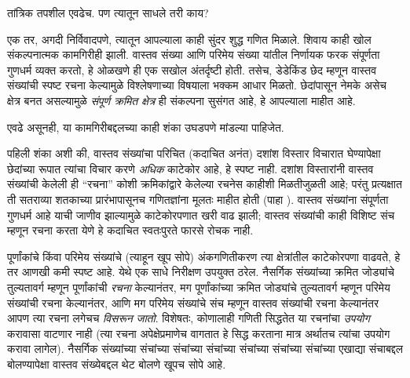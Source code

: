 \documentclass[../../../include/open-logic-section]{subfiles}
\begin{document}

तांत्रिक तपशील एवढेच. पण त्यातून साधले तरी काय?

एक तर, अगदी निर्विवादपणे, त्यातून आपल्याला काही {सुंदर} शुद्ध गणित
मिळाले. शिवाय काही खोल संकल्पनात्मक कामगिरीही झाली. वास्तव संख्या आणि
परिमेय संख्या यांतील निर्णायक फरक संपूर्णता गुणधर्म व्यक्त करतो, हे
ओळखणे ही एक सखोल अंतर्दृष्टी होती. तसेच, डेडेकिंड छेद म्हणून वास्तव
संख्यांची स्पष्ट रचना केल्यामुळे विश्लेषणाच्या विषयाला भक्कम आधार मिळतो.
छेदांपासून नेमके असेच क्षेत्र बनत असल्यामुळे \emph{संपूर्ण क्रमित क्षेत्र}
ही संकल्पना सुसंगत आहे, हे आपल्याला माहीत आहे.

एवढे असूनही, या कामगिरीबद्दलच्या काही शंका उघडपणे मांडल्या पाहिजेत.

पहिली शंका अशी की, वास्तव संख्यांचा परिचित (कदाचित अनंत) दशांश विस्तार
विचारात घेण्यापेक्षा छेदांच्या रूपात त्यांचा विचार करणे \emph{अधिक}
काटेकोर आहे, हे स्पष्ट नाही. दशांश विस्तारांनी वास्तव संख्यांची केलेली
ही ``रचना'' कोशी क्रमिकांद्वारे केलेल्या रचनेस काहीशी मिळतीजुळती आहे;
परंतु प्रत्यक्षात ती सतराव्या शतकाच्या प्रारंभापासूनच गणितज्ञांना मूलतः
माहीत होती (पाहा ). वास्तव संख्यांना संपूर्णता गुणधर्म
आहे याची जाणीव झाल्यामुळे काटेकोरपणात खरी वाढ झाली; वास्तव संख्यांची काही
विशिष्ट संच म्हणून रचना करता येणे हे कदाचित स्वतःपुरते फारसे रोचक नाही.

पूर्णांकांचे किंवा परिमेय संख्यांचे (त्याहून खूप सोपे) अंकगणितीकरण त्या
क्षेत्रांतील काटेकोरपणा वाढवते, हे तर आणखी कमी स्पष्ट आहे. येथे एक साधे
निरीक्षण उपयुक्त ठरेल. नैसर्गिक संख्यांच्या क्रमित जोड्यांचे तुल्यतावर्ग
म्हणून पूर्णांकांची \emph{रचना} केल्यानंतर, मग पूर्णांकांच्या क्रमित
जोड्यांचे तुल्यतावर्ग म्हणून परिमेय संख्यांची रचना केल्यानंतर, आणि मग
परिमेय संख्यांचे संच म्हणून वास्तव संख्यांची रचना केल्यानंतर आपण त्या
रचना लगेचच \emph{विसरून जातो}. विशेषतः, कोणालाही गणिती सिद्धतेत या
रचनांचा \emph{उपयोग} करावासा वाटणार नाही (त्या रचना अपेक्षेप्रमाणेच
वागतात हे सिद्ध करताना मात्र अर्थातच त्यांचा उपयोग करावा लागेल).
नैसर्गिक संख्यांच्या संचांच्या संचांच्या संचांच्या संचांच्या संचांच्या
संचांच्या एखाद्या संचाबद्दल बोलण्यापेक्षा वास्तव संख्येबद्दल थेट बोलणे
खूपच सोपे आहे.
%
%
%
	
\end{document}
